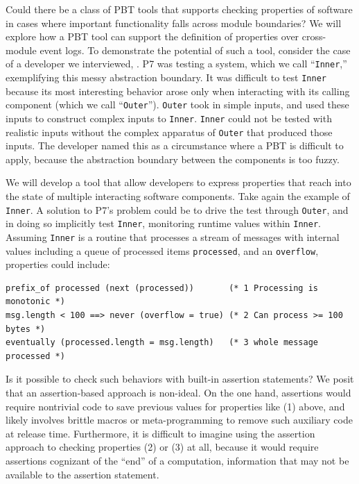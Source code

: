 Could there be a class of PBT tools that supports checking properties of
software in cases where important functionality falls across module boundaries?
We will explore how a PBT tool can support the definition of properties over
cross-module event logs. To demonstrate the potential of such a tool, consider
the case of a developer we interviewed, . P7 was testing
a system, which we call ``\lstinline{Inner},'' exemplifying this messy
abstraction
boundary. It was difficult to test \lstinline{Inner} because
its most interesting behavior arose only when interacting with its calling
component (which we call ``\lstinline{Outer}'').
\lstinline{Outer} took in simple inputs, and used these inputs to construct
complex inputs to \lstinline{Inner}. \lstinline{Inner} could not be tested with
realistic inputs without the complex apparatus of \lstinline{Outer} that
produced those inputs. The developer named this as a circumstance where a
PBT is difficult to apply, because the abstraction boundary between the
components is too fuzzy.

We will develop a tool that allow developers to express properties that reach
into the state of multiple interacting software components. Take again the
example of \lstinline{Inner}. A solution to P7's problem could be to drive the
test through \lstinline{Outer}, and in doing so implicitly test
\lstinline{Inner}, monitoring runtime values within \lstinline{Inner}. Assuming
\lstinline{Inner} is a routine that processes a stream of messages with internal
values including a queue of processed items \lstinline{processed}, and an
\lstinline{overflow}, properties could include:

\begin{lstlisting}
prefix_of processed (next (processed))       (* 1 Processing is monotonic *)
msg.length < 100 ==> never (overflow = true) (* 2 Can process >= 100 bytes *)
eventually (processed.length = msg.length)   (* 3 whole message processed *)
\end{lstlisting}

Is it possible to check such behaviors with built-in assertion statements? We
posit that an assertion-based approach is non-ideal. On the one hand, assertions
would require nontrivial code to save previous values for properties like (1)
above, and likely involves brittle macros or meta-programming to remove such
auxiliary code at release time. Furthermore, it is difficult to imagine using
the assertion approach to checking properties (2) or (3) at all, because it
would require assertions cognizant of the ``end'' of a computation, information
that may not be available to the assertion statement.

